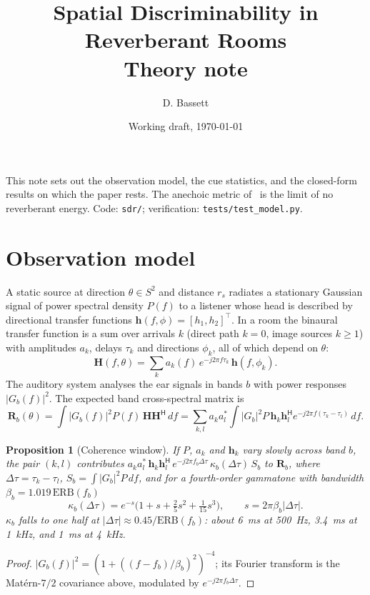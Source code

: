\documentclass[10pt]{article}
\title{Spatial Discriminability in Reverberant Rooms\\[2pt]\large Theory note}
\author{D. Bassett}
\date{Working draft, \today}
\newtheorem{proposition}{Proposition}
\theoremstyle{definition}
\begin{document}
\maketitle

\noindent This note sets out the observation model, the cue statistics, and the closed-form results on which the paper rests. The anechoic metric of~\cite{bassett2026} is the limit of no reverberant energy. Code: \texttt{sdr/}; verification: \texttt{tests/test\_model.py}.

\section{Observation model}

A static source at direction $\theta\in S^2$ and distance $r_s$ radiates a stationary Gaussian signal of power spectral density $P(f)$ to a listener whose head is described by directional transfer functions $\bm h(f,\phi)=[h_1,h_2]^{\top}$. In a room the binaural transfer function is a sum over arrivals $k$ (direct path $k=0$, image sources $k\ge1$) with amplitudes $a_k$, delays $\tau_k$ and directions $\phi_k$, all of which depend on $\theta$:
\begin{equation}
\bm H(f,\theta)=\sum_k a_k(f)\,e^{-j2\pi f\tau_k}\,\bm h(f,\phi_k).
\end{equation}
The auditory system analyses the ear signals in bands $b$ with power responses $|G_b(f)|^2$. The expected band cross-spectral matrix is
\begin{equation}
\bm R_b(\theta)=\int |G_b(f)|^2 P(f)\,\bm H\bm H^{\mathsf H}\,df
=\sum_{k,l} a_k a_l^{*}\int |G_b|^2 P\,\bm h_k\bm h_l^{\mathsf H}e^{-j2\pi f(\tau_k-\tau_l)}\,df .
\label{eq:Rb}
\end{equation}

\begin{proposition}[Coherence window]\label{prop:window}
If $P$, $a_k$ and $\bm h_k$ vary slowly across band $b$, the pair $(k,l)$ contributes $a_ka_l^{*}\,\bm h_k\bm h_l^{\mathsf H}\,e^{-j2\pi f_b\Delta\tau}\,\kappa_b(\Delta\tau)\,S_b$ to $\bm R_b$, where $\Delta\tau=\tau_k-\tau_l$, $S_b=\int|G_b|^2P\,df$, and for a fourth-order gammatone with bandwidth $\beta_b=1.019\,\mathrm{ERB}(f_b)$
\begin{equation}
\kappa_b(\Delta\tau)=e^{-s}\Big(1+s+\tfrac{2}{5}s^2+\tfrac{1}{15}s^3\Big),\qquad s=2\pi\beta_b|\Delta\tau|.
\end{equation}
$\kappa_b$ falls to one half at $|\Delta\tau|\approx0.45/\mathrm{ERB}(f_b)$: about 6~ms at 500~Hz, 3.4~ms at 1~kHz, and 1~ms at 4~kHz.
\end{proposition}
\begin{proof}
$|G_b(f)|^2=(1+((f-f_b)/\beta_b)^2)^{-4}$; its Fourier transform is the Mat\'ern-$7/2$ covariance above, modulated by $e^{-j2\pi f_b\Delta\tau}$.
\end{proof}
\end{document}
